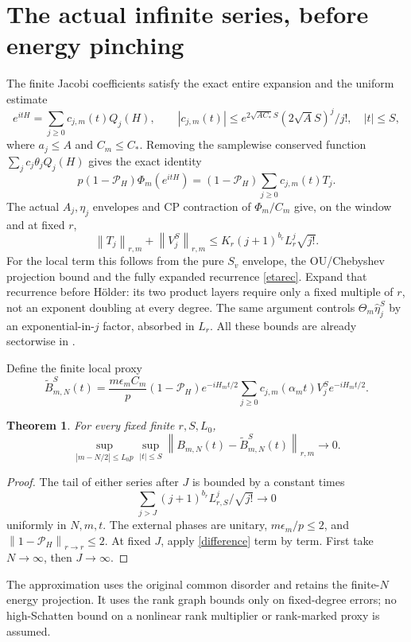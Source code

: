 \documentclass[11pt]{article}
\newcommand{\Pin}{\mathcal P_H}
\newcommand{\norm}[1]{\left\lVert#1\right\rVert}
\newcommand{\eh}{\widehat\eta}
\newtheorem{theorem}{Theorem}
\begin{document}
\newpage
\section{The actual infinite series, before energy pinching}
The finite Jacobi coefficients satisfy the exact entire expansion
and the uniform estimate \cite{series,operator}
\[
 e^{itH}=\sum_{j\ge0}c_{j,m}(t)Q_j(H),\qquad
 |c_{j,m}(t)|\le e^{2\sqrt{AC_*}S}(2\sqrt A S)^j/j!,
 \quad |t|\le S ,
\]
where $a_j\le A$ and $C_m\le C_*$. Removing the samplewise conserved
function $\sum_jc_j\theta_jQ_j(H)$ gives the exact identity
\[
 p(1-\Pin)\Phi_m(e^{itH})
       =(1-\Pin)\sum_{j\ge0}c_{j,m}(t)T_j .
\]
The actual $A_j,\eta_j$ envelopes and CP contraction of $\Phi_m/C_m$
give, on the window and at fixed $r$,
\begin{equation}\label{tails}
 \norm{T_j}_{r,m}+\norm{V_j^S}_{r,m}
       \le K_r(j+1)^{b_r}L_r^j\sqrt{j!}.
\end{equation}
For the local term this follows from the pure $S_v$ envelope, the
OU/Chebyshev projection bound and the fully expanded recurrence
\eqref{etarec}. Expand that recurrence before H\"older: its two
product layers require only a fixed multiple of $r$, not an exponent
doubling at every degree. The same argument controls
$\Theta_m\eh_j^S$ by an exponential-in-$j$ factor, absorbed in $L_r$.
All these bounds are already sectorwise in \cite{operator,gradient}.

Define the finite local proxy
\[
 \widetilde B^S_{m,N}(t)=
 \frac{m\epsilon_mC_m}{p}(1-\Pin)e^{-iH_mt/2}
       \sum_{j\ge0}c_{j,m}(\alpha_mt)V_j^S e^{-iH_mt/2}.
\]
\begin{theorem}\label{strong}
For every fixed finite $r,S,L_0$,
\[
 \sup_{|m-N/2|\le L_0p}\sup_{|t|\le S}
 \norm{B_{m,N}(t)-\widetilde B^S_{m,N}(t)}_{r,m}\longrightarrow0 .
\]
\end{theorem}
\begin{proof}
The tail of either series after $J$ is bounded by a constant times
\[
 \sum_{j>J}(j+1)^{b_r}L_{r,S}^j/\sqrt{j!}\longrightarrow0
\]
uniformly in $N,m,t$. The external phases are unitary,
$m\epsilon_m/p\le2$, and $\norm{1-\Pin}_{r\to r}\le2$.
At fixed $J$, apply \eqref{difference} term by term. First take
$N\to\infty$, then $J\to\infty$.
\end{proof}
The approximation uses the original common disorder and retains the
finite-$N$ energy projection. It uses the rank graph bounds only on
fixed-degree errors; no high-Schatten bound on a nonlinear rank
multiplier or rank-marked proxy is assumed.
\end{document}
